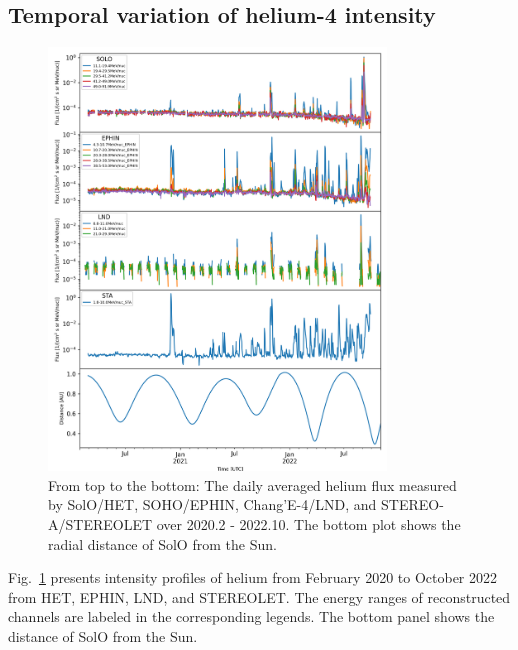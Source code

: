 \subsection*{Temporal variation of helium-4 intensity}


\begin{figure}[!htb]
    \centering
    \includegraphics[width = 0.8\textwidth]{images/ACR/overview_Helium_4_instrument.png}
    \caption[Overview of helium intensities measured by different instruments]{From top to the bottom: The daily averaged helium flux measured by \ac{SolO}/\ac{HET}, \ac{SOHO}/\ac{EPHIN}, Chang'E-4/\ac{LND}, and \ac{STEREO}-A/\ac{STEREOLET} over 2020.2 - 2022.10. The bottom plot shows the radial distance of \ac{SolO} from the Sun.}
    \label{fig:overview_helium_intensity}
\end{figure}

Fig.~\ref{fig:overview_helium_intensity} presents intensity profiles of helium from February 2020 to October 2022 from \ac{HET}, \ac{EPHIN}, \ac{LND}, and \ac{STEREOLET}. The energy ranges of reconstructed channels are labeled in the corresponding legends. The bottom panel shows the distance of \ac{SolO} from the Sun.


